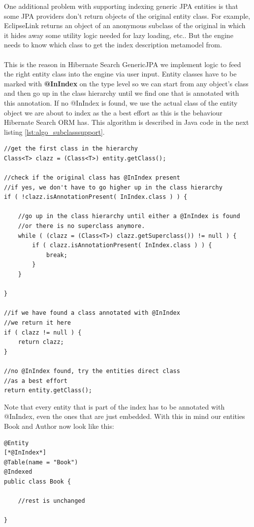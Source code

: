 \pagebreak
\noindent
One additional problem with supporting indexing generic JPA entities is that some JPA providers don't return objects of the original entity class. For example, EclipseLink returns an object of an anonymous subclass of the original in which it hides away some utility logic needed for lazy loading, etc.. But the engine needs to know which class to get the index description metamodel from.
\\\\
This is the reason in Hibernate Search GenericJPA we implement logic to feed the right entity class into the engine via user input. Entity classes have to be marked with \textbf{@InIndex} on the type level so we can start from any object's class and then go up in the class hierarchy until we find one that is annotated with this annotation. If no @InIndex is found, we use the actual class of the entity object we are about to index as the a best effort as this is the behaviour Hibernate Search ORM has. This algorithm is described in Java code in the next listing \ref{lst:algo_subclasssupport}.
\\
\lstset{language=java}
\begin{lstlisting}[frame=htrbl, caption={Algorithm to determine the actual indexed type}, label={lst:algo_subclasssupport}]
//get the first class in the hierarchy
Class<T> clazz = (Class<T>) entity.getClass();

//check if the original class has @InIndex present
//if yes, we don't have to go higher up in the class hierarchy
if ( !clazz.isAnnotationPresent( InIndex.class ) ) {

	//go up in the class hierarchy until either a @InIndex is found
	//or there is no superclass anymore.
	while ( (clazz = (Class<T>) clazz.getSuperclass()) != null ) {
		if ( clazz.isAnnotationPresent( InIndex.class ) ) {
			break;
		}
	}
	
}

//if we have found a class annotated with @InIndex
//we return it here
if ( clazz != null ) {
	return clazz;
}

//no @InIndex found, try the entities direct class
//as a best effort
return entity.getClass();
\end{lstlisting}

\pagebreak
\noindent
Note that every entity that is part of the index has to be annotated with @InIndex, even the ones that are just embedded. With this in mind our entities Book and Author now look like this:
\\
\lstset{language=java}
\begin{lstlisting}[frame=htrbl, caption={Book.java with @InIndex}, label={lst:book.java_2}]
@Entity
[*@InIndex*]
@Table(name = "Book")
@Indexed
public class Book {
	
	//rest is unchanged

}
\end{lstlisting}

